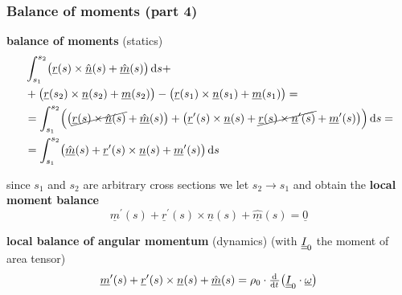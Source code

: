 \begin{frame}
  \frametitle{Balance of moments (part 4)}
  
  \textbf{balance of moments} (statics)
  \begin{displaymath}
    \begin{alignedat}{1}
      &\int_{s_1}^{s_2} \bigl( \underline{r}(s) \times \underline{\hat{n}}(s) + \underline{\hat{m}}(s)\bigr) \dif s + \\ 
      &+ \bigl( \underline{r}(s_2) \times \underline{n}(s_2) + \underline{m}(s_2) \bigr)
         - \bigl( \underline{r}(s_1) \times \underline{n}(s_1) + \underline{m}(s_1) \bigr) = \\
      &= \int_{s_1}^{s_2} \Bigl( \bigl( \cancel{\underline{r}(s) \times \underline{\hat{n}}(s)} + \underline{\hat{m}}(s) \bigr) + \bigl( \underline{r}^{\prime}(s) \times \underline{n}(s) + \cancel{\underline{r}(s) \times \underline{n}^{\prime}(s)} + \underline{m}^{\prime}(s) \bigr) \Bigr) \dif s = \\
      &= \int_{s_1}^{s_2} \bigl( \underline{\hat{m}}(s) + \underline{r}^{\prime}(s) \times \underline{n}(s) + \underline{m}^{\prime}(s) \bigr) \dif s
    \end{alignedat}
  \end{displaymath}
  
  since $s_1$ and $s_2$ are arbitrary cross sections we let $s_2 \to s_1$ \newline
  and obtain the \textbf{local moment balance}
  \begin{displaymath}
    \underline{m}^{\prime}(s) + \underline{r}^{\prime}(s) \times \underline{n}(s) + \underline{\hat{m}}(s) = \underline{0}
  \end{displaymath}

  \vspace{0.7em}
  \textbf{local balance of angular momentum} (dynamics) (with $\underline{\underline{I}}_0$ the moment of area tensor)
  \begin{displaymath}
    \underline{m}^{\prime}(s) +
    \underline{r}^{\prime}(s) \times \underline{n}(s) +
    \underline{\hat{m}}(s) =
    \rho_0 \cdot
    \od{}{t} \bigl( \doubleunderline{I}_0 \cdot \underline{\omega} \bigr)
  \end{displaymath}
\end{frame}



